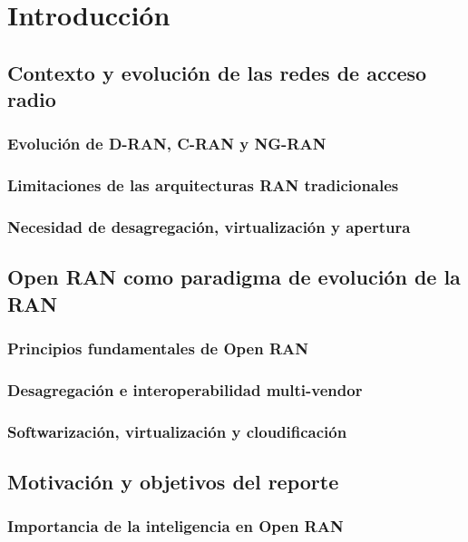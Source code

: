 \documentclass[11pt,a4paper]{article}
\makeatletter
\let\ORIGsection\section
\def\section{\@nobreakfalse\ORIGsection}
\let\ORIGsubsection\subsection
\def\subsection{\@nobreakfalse\ORIGsubsection}
\let\ORIGsubsubsection\subsubsection
\def\subsubsection{\@nobreakfalse\ORIGsubsubsection}
\makeatother
\begin{document}
\section{Introducción}

\subsection{Contexto y evolución de las redes de acceso radio}

\subsubsection{Evolución de D-RAN, C-RAN y NG-RAN}
\subsubsection{Limitaciones de las arquitecturas RAN tradicionales}
\subsubsection{Necesidad de desagregación, virtualización y apertura}

\subsection{Open RAN como paradigma de evolución de la RAN}

\subsubsection{Principios fundamentales de Open RAN}
\subsubsection{Desagregación e interoperabilidad multi-vendor}
\subsubsection{Softwarización, virtualización y cloudificación}

\subsection{Motivación y objetivos del reporte}

\subsubsection{Importancia de la inteligencia en Open RAN}
\end{document}
